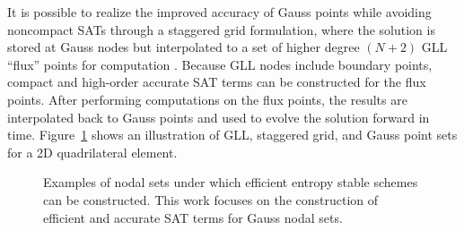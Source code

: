 \documentclass[review,onefignum,onetabnum,final]{siamart171218}
\begin{document}
It is possible to realize the improved accuracy of Gauss points while avoiding noncompact SATs through a staggered grid formulation, where the solution is stored at Gauss nodes but interpolated to a set of higher degree $(N+2)$ GLL ``flux'' points for computation \cite{parsani2016entropy}.  Because GLL nodes include boundary points, compact and high-order accurate SAT terms can be constructed for the flux points.  After performing computations on the flux points, the results are interpolated back to Gauss points and used to evolve the solution forward in time.  Figure~\ref{fig:nodesets} shows an illustration of GLL, staggered grid, and Gauss point sets for a 2D quadrilateral element.  

\begin{figure}
\centering
{}
\hspace{.5em}
\hspace{.5em}
\caption{Examples of nodal sets under which efficient entropy stable schemes can be constructed.  This work focuses on the construction of efficient and accurate SAT terms for Gauss nodal sets.}
\label{fig:nodesets}
\end{figure}
\end{document}
